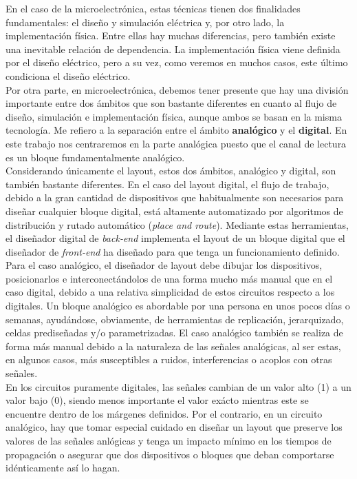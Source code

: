 En el caso de la microelectrónica, estas técnicas tienen dos finalidades fundamentales:
el diseño y simulación eléctrica y, por otro lado, la implementación física. Entre ellas
hay muchas diferencias, pero también existe una inevitable relación de dependencia.
La implementación física viene definida por el diseño eléctrico, pero a su vez, como
veremos en muchos casos, este último condiciona el diseño eléctrico.\\

Por otra parte, en microelectrónica, debemos tener presente que
hay una división importante entre dos ámbitos que son bastante diferentes en cuanto
al flujo de diseño, simulación e implementación física, aunque ambos se basan en
la misma tecnología. Me refiero a la separación entre el ámbito \textbf{analógico}
y el \textbf{digital}. En este trabajo nos centraremos en la parte analógica
puesto que el canal de lectura es un bloque fundamentalmente analógico.\\

Considerando únicamente el layout, estos dos ámbitos, analógico y
digital, son también bastante diferentes. En el caso del layout digital, el flujo
de trabajo, debido a la gran cantidad de dispositivos que habitualmente son necesarios
para diseñar cualquier bloque digital, está altamente automatizado por algoritmos
de distribución y rutado automático (\textit{place and route}). Mediante estas
herramientas, el diseñador digital de \textit{back-end} implementa el layout de un bloque
digital que el diseñador de \textit{front-end} ha diseñado para que tenga un funcionamiento
definido.\\

Para el caso analógico, el diseñador de layout debe dibujar los
dispositivos, posicionarlos e interconectándolos de una forma mucho más manual que en el caso
digital, debido a una relativa simplicidad de estos circuitos respecto a los digitales.
Un bloque analógico es abordable por una persona en unos pocos días o
semanas, ayudándose, obviamente, de herramientas de replicación, jerarquizado, celdas
prediseñadas y/o parametrizadas. El caso analógico también se realiza de forma más
manual debido a la naturaleza de las señales analógicas, al ser estas, en algunos casos,
más susceptibles a ruidos, interferencias o acoplos con otras señales.\\

En los circuitos puramente digitales, las señales cambian de un
valor alto (1) a un valor bajo (0), siendo menos importante el valor exácto
mientras este se encuentre dentro de los márgenes definidos. Por el contrario,
en un circuito analógico, hay que tomar especial cuidado en diseñar un layout que preserve
los valores de las señales anlógicas y tenga un impacto mínimo en los tiempos de
propagación o asegurar que dos dispositivos o bloques que deban comportarse idénticamente
así lo hagan.\\

